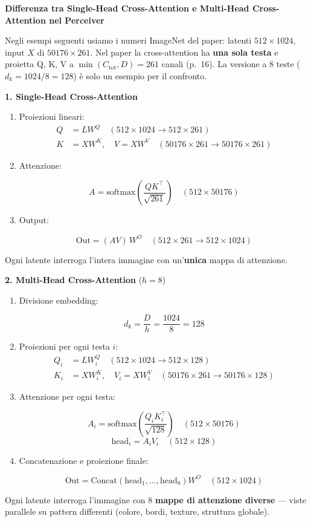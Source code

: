 \documentclass[
  11pt,
]{article}
\begin{document}
\textbf{Differenza tra Single-Head Cross-Attention e Multi-Head
Cross-Attention nel Perceiver}

\begin{notabox}
Negli esempi seguenti usiamo i numeri ImageNet del paper: latenti $512 \times 1024$, input $X$ di $50176 \times 261$. Nel paper la cross-attention ha \textbf{una sola testa} e proietta Q, K, V a $\min(C_{\text{tot}}, D) = 261$ canali (p.~16). La versione a 8 teste ($d_k = 1024/8 = 128$) è solo un esempio per il confronto.
\end{notabox}

\textbf{1. Single-Head Cross-Attention}
\begin{enumerate}
\item Proiezioni lineari:
\begin{align*}
Q &= L W^Q \quad (512 \times 1024 \to 512 \times 261) \\
K &= X W^K, \quad V = X W^V \quad (50176 \times 261 \to 50176 \times 261)
\end{align*}
\item Attenzione:

\[
A = \text{softmax}\!\left(\frac{QK^\top}{\sqrt{261}}\right) \quad (512 \times 50176)
\]
\item Output:

\[
\text{Out} = (A V)\, W^O \quad (512 \times 261 \to 512 \times 1024)
\]
\end{enumerate}
Ogni latente interroga l'intera immagine con un'\textbf{unica} mappa di attenzione.

\textbf{2. Multi-Head Cross-Attention} ($h = 8$)

\begin{enumerate}
\item Divisione embedding:

\[
d_k = \frac{D}{h} = \frac{1024}{8} = 128
\]
\item Proiezioni per ogni testa $i$:
\begin{align*}
Q_i &= L W_i^Q \quad (512 \times 1024 \to 512 \times 128) \\
K_i &= X W_i^K, \quad V_i = X W_i^V \quad (50176 \times 261 \to 50176 \times 128)
\end{align*}
\item Attenzione per ogni testa:

\[
A_i = \text{softmax}\!\left(\frac{Q_i K_i^\top}{\sqrt{128}}\right) \quad (512 \times 50176)
\]
\[
\text{head}_i = A_i V_i \quad (512 \times 128)
\]
\item Concatenazione e proiezione finale:

\[
\text{Out} = \text{Concat}(\text{head}_1, \ldots, \text{head}_8) W^O \quad (512 \times 1024)
\]
\end{enumerate}
Ogni latente interroga l'immagine con 8 \textbf{mappe di attenzione diverse} --- viste parallele su pattern differenti (colore, bordi, texture, struttura globale).
\end{document}
